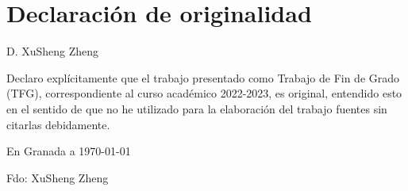 %
\chapter*{Declaración de originalidad}

D. XuSheng Zheng

Declaro explícitamente que el trabajo presentado como Trabajo de Fin de Grado (TFG), correspondiente al curso académico 2022-2023, es original, entendido esto en el sentido de que no he utilizado para la elaboración del trabajo fuentes sin citarlas debidamente.
\medskip

En Granada a \today 
\begin{flushleft} 
Fdo: XuSheng Zheng

\end{flushleft}

\vfill

\endinput
